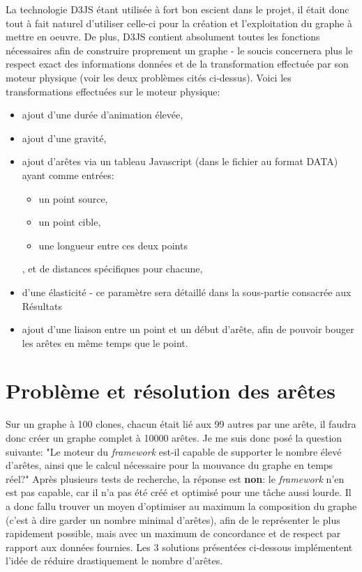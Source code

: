 \documentclass[12pt]{report}
\begin{document}
\begin{spacing}{1.2}
La technologie D3JS étant utilisée à fort bon escient dans le projet, il était donc tout à fait naturel d'utiliser celle-ci pour la création et l'exploitation du graphe à mettre en oeuvre.
De plus, D3JS contient absolument toutes les fonctions nécessaires afin de construire proprement un graphe - le soucis concernera plus le respect exact des informations données et de la transformation effectuée par son moteur physique (voir les deux problèmes cités ci-dessus).
\newline
Voici les transformations effectuées sur le moteur physique:
\begin{itemize}
\item{ajout d'une durée d'animation élevée,}
\item{ajout d'une gravité,}
\item{ajout d'arêtes via un tableau Javascript (dans le fichier au format DATA) ayant comme entrées:	
\begin{itemize}
\item{un point source,}
\item{un point cible,}
\item{une longueur entre ces deux points}
\end{itemize}
, et de distances spécifiques pour chacune,}
\item{d'une élasticité - ce paramètre sera détaillé dans la sous-partie consacrée aux Résultats}
\item{ajout d'une liaison entre un point et un début d'arête, afin de pouvoir bouger les arêtes en même temps que le point.}
\end{itemize}

\section{Problème et résolution des arêtes}

Sur un graphe à 100 clones, chacun était lié aux 99 autres par une arête, il faudra donc créer un graphe complet à 10000 arêtes. 
Je me suis donc posé la question suivante: "Le moteur du \textit{framework} est-il capable de supporter le nombre élevé d'arêtes, ainsi que le calcul nécessaire pour la mouvance du graphe en temps réel?"
\newline
Après plusieurs tests de recherche, la réponse est \textbf{non}: le \textit{framework} n'en est pas capable, car il n'a pas été créé et optimisé pour une tâche aussi lourde.
\newline
Il a donc fallu trouver un moyen d'optimiser au maximum la composition du graphe (c'est à dire garder un nombre minimal d'arêtes), afin de le représenter le plus rapidement possible, mais avec un maximum de concordance et de respect par rapport aux données fournies.
\newline
Les 3 solutions présentées ci-dessous implémentent l'idée de réduire drastiquement le nombre d'arêtes.


\end{spacing}
\end{document}
